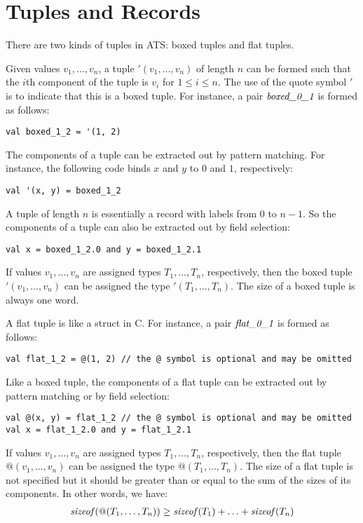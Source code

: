 
\section{Tuples and Records}
There are two kinds of tuples in ATS: boxed tuples and flat tuples.

Given values $v_1,\ldots, v_n$, a tuple $'(v_1,\ldots,v_n)$ of length $n$
can be formed such that the $i$th component of the tuple is $v_i$ for
$1\leq i\leq n$. The use of the quote symbol $'$ is to indicate that this
is a boxed tuple.  For instance, a pair $\mbox{\it boxed\_0\_1}$ is
formed as follows:
\begin{verbatim}
val boxed_1_2 = '(1, 2)
\end{verbatim}
The components of a tuple can be extracted out by pattern matching. For
instance, the following code binds $x$ and $y$ to $0$ and $1$,
respectively:
\begin{verbatim}
val '(x, y) = boxed_1_2
\end{verbatim}
A tuple of length $n$ is essentially a record with labels from $0$ to
$n-1$. So the components of a tuple can also be extracted out by field
selection:
\begin{verbatim}
val x = boxed_1_2.0 and y = boxed_1_2.1
\end{verbatim}
If values $v_1,\ldots,v_n$ are assigned types $T_1,\ldots,T_n$,
respectively, then the boxed tuple $'(v_1,\ldots,v_n)$ can be assigned the type
$'(T_1,\ldots,T_n)$. The size of a boxed tuple is always one word.

A flat tuple is like a struct in C. For instance, a pair $\mbox{\it
flat\_0\_1}$ is formed as follows:
\begin{verbatim}
val flat_1_2 = @(1, 2) // the @ symbol is optional and may be omitted
\end{verbatim}
Like a boxed tuple, the components of a flat tuple can be extracted out
by pattern matching or by field selection:
\begin{verbatim}
val @(x, y) = flat_1_2 // the @ symbol is optional and may be omitted
val x = flat_1_2.0 and y = flat_1_2.1
\end{verbatim}
If values $v_1,\ldots,v_n$ are assigned types $T_1,\ldots,T_n$,
respectively, then the flat tuple $@(v_1,\ldots,v_n)$ can be assigned the
type $@(T_1,\ldots,T_n)$. The size of a flat tuple is not specified but it
should be greater than or equal to the sum of the sizes of
its components. In other words, we have:
\[\begin{array}{l}
{\it sizeof}(@(T_1,\ldots,T_n)) \geq {\it sizeof}(T_1) + \ldots + {\it sizeof}(T_n)
\end{array}\]

